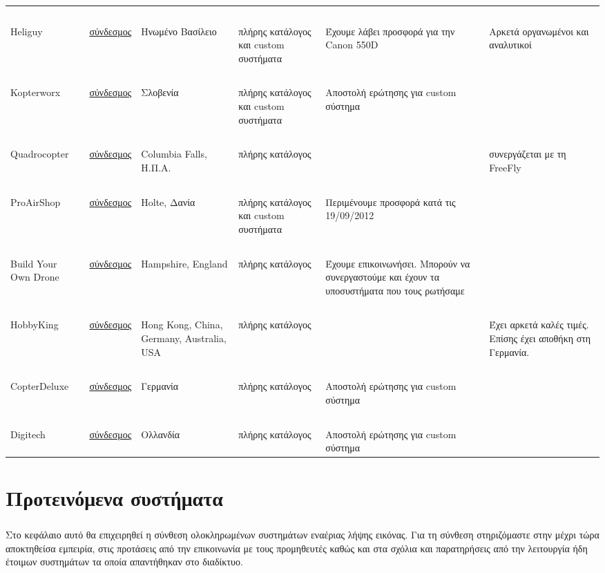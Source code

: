 \documentclass[a4paper, 12pt, twoside]{report}
\begin{document}
\begin{landscape}
\begin{longtable}{ m{2cm} m{2cm} m{2cm} m{4cm} m{4cm} m{4cm} }
				~\\
				Heliguy & \href{http://quadcopter.heliguy.com/}{σύνδεσμος} & Ηνωμένο Βασίλειο & πλήρης κατάλογος και custom συστήματα & Έχουμε λάβει προσφορά για την Canon 550D & Αρκετά οργανωμένοι και αναλυτικοί\\
				\hdashline
				~\\
				Kopterworx & \href{http://www.kopterworx.com/}{σύνδεσμος} & Σλοβενία & πλήρης κατάλογος και custom συστήματα & Αποστολή ερώτησης για custom σύστημα & \\
				\hdashline
				~\\
				Quadrocopter & \href{http://www.quadrocopter.com/}{σύνδεσμος} & Columbia Falls, Η.Π.Α. & πλήρης κατάλογος & & συνεργάζεται με τη FreeFly\\
				\hdashline
				~\\
				ProAirShop & \href{http://www.proairshop.com/}{σύνδεσμος} & Holte, Δανία & πλήρης κατάλογος και custom συστήματα & Περιμένουμε προσφορά κατά τις 19/09/2012 & \\
				\hdashline
				~\\
				Build Your Own Drone & \href{http://www.buildyourowndrone.co.uk/}{σύνδεσμος} & Hampshire, England & πλήρης κατάλογος & Έχουμε επικοινωνήσει. Μπορούν να συνεργαστούμε και έχουν τα υποσυστήματα που τους ρωτήσαμε & \\
				\hdashline
				~\\
				HobbyKing & \href{http://www.hobbyking.com}{σύνδεσμος} & Hong Kong, China, Germany, Australia, USA & πλήρης κατάλογος & & Έχει αρκετά καλές τιμές. Επίσης έχει αποθήκη στη Γερμανία.\\
				\hdashline
				~\\
				CopterDeluxe & \href{http://www.copterdeluxe.com}{σύνδεσμος} & Γερμανία & πλήρης κατάλογος &  Αποστολή ερώτησης για custom σύστημα &\\
				\hdashline
				~\\
				Digitech & \href{http://digitech.nl/}{σύνδεσμος} & Ολλανδία & πλήρης κατάλογος &  Αποστολή ερώτησης για custom σύστημα &\\
				\hline
		\end{longtable}
		\end{landscape}
		
	
	\chapter{Προτεινόμενα συστήματα}
	
		\paragraph{}{Στο κεφάλαιο αυτό θα επιχειρηθεί η σύνθεση ολοκληρωμένων συστημάτων εναέριας λήψης εικόνας. Για τη σύνθεση στηριζόμαστε στην μέχρι τώρα αποκτηθείσα εμπειρία, στις προτάσεις από την επικοινωνία με τους προμηθευτές καθώς και στα σχόλια και παρατηρήσεις από την λειτουργία ήδη έτοιμων συστημάτων τα οποία απαντήθηκαν στο διαδίκτυο.
		}
		
\end{document}

